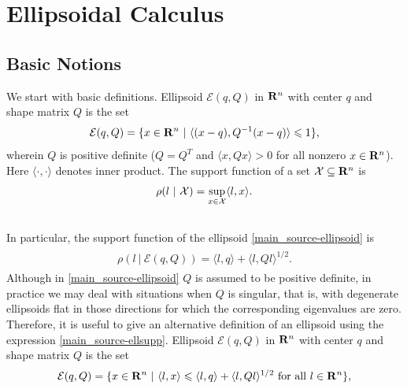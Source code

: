 \documentclass[letterpaper,10pt,english]{sphinxmanual}
\begin{document}
\chapter{Ellipsoidal Calculus}
\label{main_source:ellipsoidal-calculus}

\section{Basic Notions}
\label{main_source:basic-notions}
We start with basic definitions.
Ellipsoid ${\mathcal E}(q,Q)$ in
${\bf R}^n$ with center $q$ and shape matrix $Q$ is
the set
\label{main_source:equation-ellipsoid}\begin{gather}
\begin{split}{\mathcal E}(q,Q) = \{ x \in {\bf R}^n ~|~ \langle (x-q), Q^{-1}(x-q)\rangle\leqslant1 \},\end{split}\label{main_source-ellipsoid}
\end{gather}
wherein $Q$ is positive definite ($Q=Q^T$ and
$\langle x, Qx\rangle>0$ for all nonzero $x\in{\bf R}^n$).
Here $\langle\cdot,\cdot\rangle$ denotes inner
product. The support function of a set
${\mathcal X}\subseteq{\bf R}^n$ is
\begin{gather}
\begin{split}\rho(l~|~{\mathcal X}) = \sup_{x\in{\mathcal X}} \langle l,x\rangle.\end{split}\notag\\\begin{split}\end{split}\notag
\end{gather}
In particular, the support function of the ellipsoid \eqref{main_source-ellipsoid} is
\label{main_source:equation-ellsupp}\begin{gather}
\begin{split}\rho(l~|~{\mathcal E}(q,Q)) = \langle l, q\rangle + \langle l, Ql\rangle^{1/2}.\end{split}\label{main_source-ellsupp}
\end{gather}
Although in \eqref{main_source-ellipsoid} $Q$ is assumed to be positive definite,
in practice we may deal with situations when $Q$ is singular, that
is, with degenerate ellipsoids flat in those directions for which the
corresponding eigenvalues are zero. Therefore, it is useful to give an
alternative definition of an ellipsoid using the expression \eqref{main_source-ellsupp}.
Ellipsoid ${\mathcal E}(q,Q)$ in ${\bf R}^n$ with center
$q$ and shape matrix $Q$ is the set
\label{main_source:equation-ellipsoid2}\begin{gather}
\begin{split}{\mathcal E}(q,Q) = \{ x \in {\bf R}^n ~|~
\langle l,x\rangle\leqslant\langle l,q\rangle + \langle l,Ql\rangle^{1/2}
\mbox{ for all } l\in{\bf R}^n \},\end{split}\label{main_source-ellipsoid2}
\end{gather}
\end{document}
